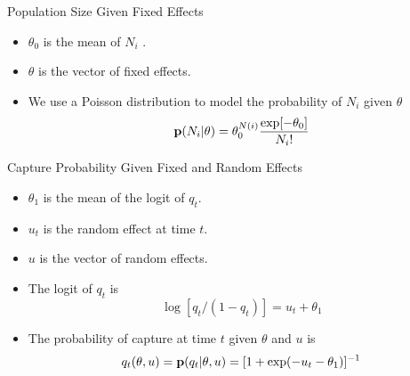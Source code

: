 \documentclass{beamer}
\newcommand{\B}[1]{{\bf #1}}
\begin{document}
\begin{frame}{Population Size Given Fixed Effects}
\begin{itemize}

\item
$\theta_0$ is the mean of $N_i$ .
\pause

\item
$\theta$ is the vector of fixed effects.
\pause

\item
We use a Poisson distribution to model the probability of $N_i$
given $\theta$
\[
\B{p} ( N_i | \theta  )
=
\theta_0^{N(i)} \frac{ \exp[ - \theta_0 ] }{ N_i ! }
\]

\end{itemize}
\end{frame}

\begin{frame}{Capture Probability Given Fixed and Random Effects}
\begin{itemize}

\item
$\theta_1$ is the mean of the logit of $q_t$.
\pause

\item
$u_t$ is the random effect at time $t$.
\pause

\item
$u$ is the vector of random effects.
\pause

\item
The logit of $q_t$ is
\[
    \log [ q_t / ( 1 - q_t ) ] = u_t + \theta_1
\]
\pause

\item
The probability of capture at time $t$ given $\theta$ and $u$ is
\[
    q_t ( \theta , u )
    =
    \B{p} ( q_t | \theta , u )
    =
    [ 1 + \exp( - u_t - \theta_1 ) ]^{-1}
\]


\end{itemize}
\end{frame}
\end{document}
